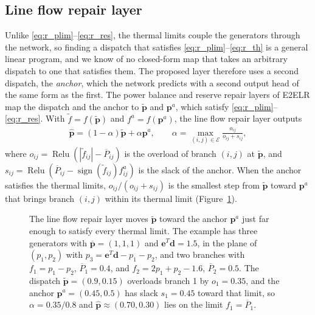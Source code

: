 \documentclass[12pt]{article}
\begin{document}
\subsection{Line flow repair layer}
Unlike \eqref{eq:r_plim}--\eqref{eq:r_res}, the thermal limits couple the generators through the network, so finding a dispatch that satisfies \eqref{eq:r_plim}--\eqref{eq:r_th} is a general linear program, and we know of no closed-form map that takes an arbitrary dispatch to one that satisfies them. The proposed layer therefore uses a second dispatch, the \emph{anchor}, which the network predicts with a second output head of the same form as the first.
The power balance and reserve repair layers of E2ELR map the dispatch and the anchor to $\tilde{\boldsymbol{p}}$ and $\boldsymbol{p}^a$, which satisfy \eqref{eq:r_plim}--\eqref{eq:r_res}. With $\tilde{f} = f(\tilde{\boldsymbol{p}})$ and $f^a = f(\boldsymbol{p}^a)$, the line flow repair layer outputs
\begin{align}
    \hat{\boldsymbol{p}} = (1 - \alpha) \tilde{\boldsymbol{p}} + \alpha \boldsymbol{p}^a, \qquad
    \alpha = \max_{(i,j) \in \mathcal{E}} \frac{o_{ij}}{o_{ij} + s_{ij}}, \label{eq:line_repair}
\end{align}
where $o_{ij} = \operatorname{Relu}(|\tilde{f}_{ij}| - \overline{P}_{ij})$ is the overload of branch $(i,j)$ at $\tilde{\boldsymbol{p}}$, and $s_{ij} = \operatorname{Relu}(\overline{P}_{ij} - \operatorname{sign}(\tilde{f}_{ij}) f^a_{ij})$ is the slack of the anchor.
When the anchor satisfies the thermal limits, $o_{ij}/(o_{ij} + s_{ij})$ is the smallest step from $\tilde{\boldsymbol{p}}$ toward $\boldsymbol{p}^a$ that brings branch $(i,j)$ within its thermal limit (Figure~\ref{fig:line_repair}).

\begin{figure}[htbp]
    \centering
    
    \caption{The line flow repair layer moves $\tilde{\boldsymbol{p}}$ toward the anchor $\boldsymbol{p}^a$ just far enough to satisfy every thermal limit. The example has three generators with $\overline{\boldsymbol{p}} = (1, 1, 1)$ and $\mathbf{e}^T \boldsymbol{d} = 1.5$, in the plane of $(p_1, p_2)$ with $p_3 = \mathbf{e}^T \boldsymbol{d} - p_1 - p_2$, and two branches with $f_1 = p_1 - p_2$, $\overline{P}_1 = 0.4$, and $f_2 = 2p_1 + p_2 - 1.6$, $\overline{P}_2 = 0.5$. The dispatch $\tilde{\boldsymbol{p}} = (0.9, 0.15)$ overloads branch 1 by $o_1 = 0.35$, and the anchor $\boldsymbol{p}^a = (0.45, 0.5)$ has slack $s_1 = 0.45$ toward that limit, so $\alpha = 0.35/0.8$ and $\hat{\boldsymbol{p}} \approx (0.70, 0.30)$ lies on the limit $f_1 = \overline{P}_1$.}
    \label{fig:line_repair}
\end{figure}
\end{document}
